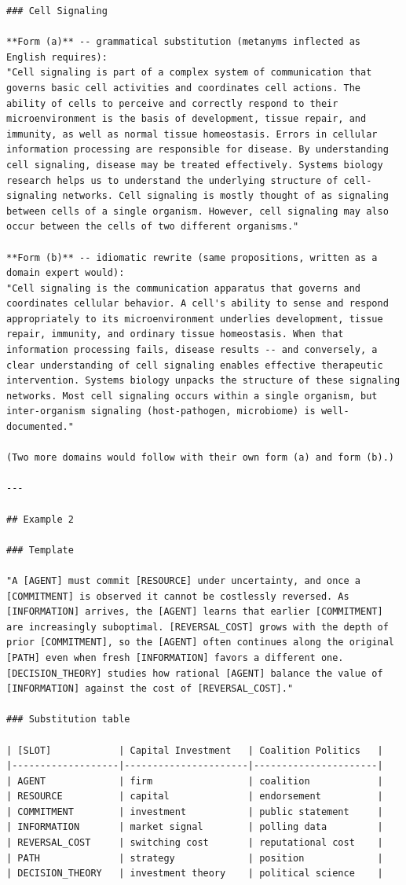 \documentclass{article}
\begin{document}
\begin{lstlisting}
### Cell Signaling

**Form (a)** -- grammatical substitution (metanyms inflected as English requires):
"Cell signaling is part of a complex system of communication that governs basic cell activities and coordinates cell actions. The ability of cells to perceive and correctly respond to their microenvironment is the basis of development, tissue repair, and immunity, as well as normal tissue homeostasis. Errors in cellular information processing are responsible for disease. By understanding cell signaling, disease may be treated effectively. Systems biology research helps us to understand the underlying structure of cell-signaling networks. Cell signaling is mostly thought of as signaling between cells of a single organism. However, cell signaling may also occur between the cells of two different organisms."

**Form (b)** -- idiomatic rewrite (same propositions, written as a domain expert would):
"Cell signaling is the communication apparatus that governs and coordinates cellular behavior. A cell's ability to sense and respond appropriately to its microenvironment underlies development, tissue repair, immunity, and ordinary tissue homeostasis. When that information processing fails, disease results -- and conversely, a clear understanding of cell signaling enables effective therapeutic intervention. Systems biology unpacks the structure of these signaling networks. Most cell signaling occurs within a single organism, but inter-organism signaling (host-pathogen, microbiome) is well-documented."

(Two more domains would follow with their own form (a) and form (b).)

---

## Example 2

### Template

"A [AGENT] must commit [RESOURCE] under uncertainty, and once a [COMMITMENT] is observed it cannot be costlessly reversed. As [INFORMATION] arrives, the [AGENT] learns that earlier [COMMITMENT] are increasingly suboptimal. [REVERSAL_COST] grows with the depth of prior [COMMITMENT], so the [AGENT] often continues along the original [PATH] even when fresh [INFORMATION] favors a different one. [DECISION_THEORY] studies how rational [AGENT] balance the value of [INFORMATION] against the cost of [REVERSAL_COST]."

### Substitution table

| [SLOT]            | Capital Investment   | Coalition Politics   |
|-------------------|----------------------|----------------------|
| AGENT             | firm                 | coalition            |
| RESOURCE          | capital              | endorsement          |
| COMMITMENT        | investment           | public statement     |
| INFORMATION       | market signal        | polling data         |
| REVERSAL_COST     | switching cost       | reputational cost    |
| PATH              | strategy             | position             |
| DECISION_THEORY   | investment theory    | political science    |


\end{lstlisting}
\end{document}
